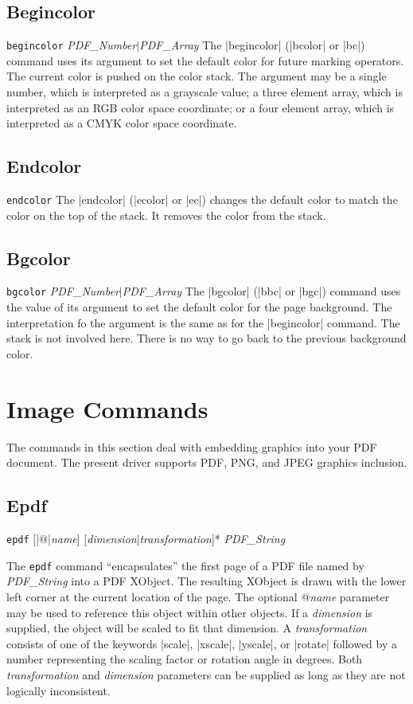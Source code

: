 {\subsection{Begincolor}
\syntax
{\tt begincolor} {\it PDF\_Number$\vert$\it PDF\_Array}
\description
The |begincolor| (|bcolor| or |bc|) command uses its
argument to set the default color for future marking operators.
The current color is pushed on the color stack.  The argument
may be a single number, which is interpreted as a grayscale
value; a three element array, which is interpreted as an RGB
color space coordinate; or a four element array, which
is interpreted as a CMYK color space coordinate.
\example
\begintt
{}
\endtt

\subsection{Endcolor}
\syntax
{\tt endcolor}
\description
The |endcolor| (|ecolor| or |ec|)
changes the default color to
match the color on the top
of the stack.  It removes
the color from the stack.
\example
\begintt
{}
\endtt

\subsection{Bgcolor}
\syntax
{\tt bgcolor} {\it PDF\_Number$\vert$\it PDF\_Array}
\description
The |bgcolor| (|bbc| or |bgc|) command uses the value
of its argument to set the default color for the page
background.  The interpretation
fo the argument is the same as for the |begincolor| command.
The stack is not involved here.  There is no way
to go back to the previous background color.
\example
\begintt
{}
\endtt

\section{Image Commands}
The commands in this section deal with embedding
graphics into your PDF document.  The present
driver supports PDF, PNG, and JPEG graphics inclusion.

\subsection{Epdf}
\syntax
{\tt epdf} [|@|{\it name}] [{\it dimension}$\vert${\it transformation}]*  {\it PDF\_String}

\description
The {\tt epdf} command ``encapsulates'' the first page of a PDF
file named by {\it PDF\_String}
into a PDF XObject.  The resulting XObject is drawn
with the lower left corner at the current location of the page.
The optional @{\it name} parameter may be used
to reference this object within other objects.  If a
{\it dimension} is supplied, the object will be scaled to fit
that dimension.  A {\it transformation} consists of one of the keywords
|scale|, |xscale|, |yscale|, or |rotate|
followed by a number representing
the scaling factor or rotation angle in degrees.  Both {\it transformation} and {\it dimension}
parameters can be supplied as long as they are not logically
inconsistent.

}
